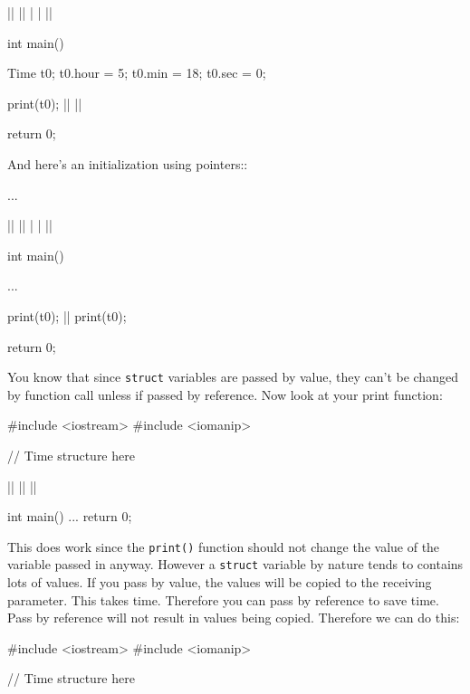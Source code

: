 \begin{center}
\begin{center}
\begin{consolethree}[escapeinside=||]
||
|\EMPHASIZE{\{}|
|  |
|\EMPHASIZE{\}}|

int main()
{
  Time t0;
  t0.hour = 5;
  t0.min = 18;
  t0.sec = 0;

  print(t0);
  ||
  ||

  return 0;
}
\end{consolethree}

And here's an initialization using pointers::

\begin{consolethree}[escapeinside=||]
...

||
|\EMPHASIZE{\{}|
|  |
|\EMPHASIZE{\}}|

int main()
{
  ...

  print(t0);
  ||
  print(t0);

  return 0;
}
\end{consolethree}


\newpage{}

You know that since \texttt{struct} variables are passed by value, they
can't be changed by function call unless if passed by reference. Now look at
your print function:

\begin{consolethree}[escapeinside=||]
#include <iostream>
#include <iomanip>

// Time structure here

||
|\EMPHASIZE{\{}|
|\EMPHASIZE{\}}|

int main()
{
  ...
  return 0;
}
\end{consolethree}

This does work since the \texttt{print()} function should not change the value
of the variable passed in anyway. However a \texttt{struct} variable by nature
tends to contains lots of values. If you pass by value, the values will be
copied to the receiving parameter. This takes time. Therefore you can
pass by reference to save time. Pass by reference will not result in
values being copied. Therefore we can do this:

\begin{consolethree}[escapeinside=||]
#include <iostream>
#include <iomanip>

// Time structure here


\end{consolethree}
\end{center}
\end{center}
